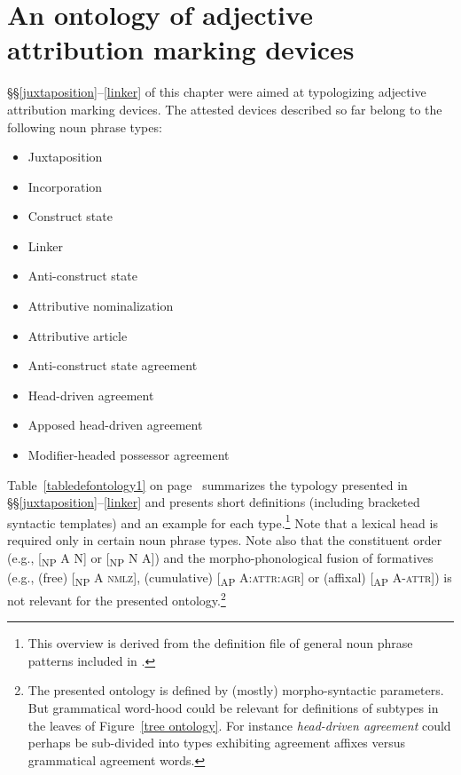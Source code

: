 \section[Ontology of attribution marking]{An ontology of adjective attribution marking devices}
\label{ontol}
\S\S\ref{juxtaposition}–\ref{linker} of this chapter were aimed at typologizing adjective attribution marking devices. The attested devices described so far belong to the following noun phrase types:
\begin{itemize}
\item{Juxtaposition}
\item{Incorporation}
\item{Construct state}
\item{Linker}
\item{Anti\hyp{}construct state}
\item{Attributive nominalization}
\item{Attributive article}
\item{Anti\hyp{}construct state agreement}
\item{Head\hyp{}driven agreement}
\item{Apposed head\hyp{}driven agreement}
\item{Modifier\hyp{}headed possessor agreement}
\end{itemize}
Table~\ref{tabledefontology1} on page~\pageref{tabledefontology1} summarizes the typology presented in \S\S\ref{juxtaposition}–\ref{linker} and presents short definitions (including bracketed syntactic templates) and an example for each type.\footnote{This overview is derived from the definition file of general noun phrase patterns included in \citet{AUTOTYP-NP}.} Note that a lexical head is required only in certain noun phrase types. Note also that the constituent order (e.g., {\upshape [}\textsubscript{NP} A N{\upshape ]} or {\upshape [}\textsubscript{NP} N A{\upshape ]}) and the morpho-phonological fusion of formatives (e.g., (free) {\upshape [}\textsubscript{NP} A \textsc{nmlz}{\upshape ]}, (cumulative) {\upshape [}\textsubscript{AP} A:\textsc{attr:agr}{\upshape ]} or (affixal) {\upshape [}\textsubscript{AP} A-\textsc{attr}{\upshape ]}) is not relevant for the presented ontology.\footnote{The presented ontology is defined by (mostly) morpho-syntactic parameters. But grammatical word-hood could be relevant for definitions of subtypes in the leaves of Figure~\ref{tree ontology}. For instance \textit{head\hyp{}driven agreement} could perhaps be sub-divided into types exhibiting agreement affixes versus grammatical agreement words.}

